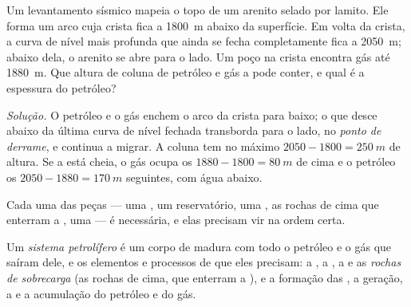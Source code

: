 \begin{example}\label{ex:g11:fossil-fuel-geology:anticline}
Um levantamento sísmico mapeia o topo de um arenito selado por lamito. Ele
forma um arco cuja crista fica a \qty{1800}{m} abaixo da superfície. Em
volta da crista, a curva de nível mais profunda que ainda se fecha
completamente fica a \qty{2050}{m}; abaixo dela, o arenito se abre para o
lado. Um poço na crista encontra gás até \qty{1880}{m}. Que altura de
coluna de petróleo e gás a  pode conter, e qual é a espessura do
petróleo?

\emph{Solução.} O petróleo e o gás enchem o arco da crista para baixo; o que
desce abaixo da última curva de nível fechada transborda para o lado, no
\emph{ponto de derrame}, e continua a migrar. A coluna tem no máximo
$2050 - 1800 = \qty{250}{m}$ de altura. Se a  está cheia, o gás
ocupa os $1880 - 1800 = \qty{80}{m}$ de cima e o petróleo os
$2050 - 1880 = \qty{170}{m}$ seguintes, com água abaixo.
\end{example}

Cada uma das peças --- uma , um reservatório, uma , as rochas de cima que enterram a , uma  ---
é necessária, e elas precisam vir na ordem certa.

\begin{definition}\label{def:g11:fossil-fuel-geology:petroleum-system}
Um \emph{sistema petrolífero}
é um corpo de  madura com todo o petróleo e o gás que saíram
dele, e os elementos e processos de que eles precisam: a , a
, a  e as \emph{rochas de
sobrecarga} (as rochas de cima, que enterram a
), e a formação das , a geração, a  e a
acumulação do petróleo e do gás.
\end{definition}

